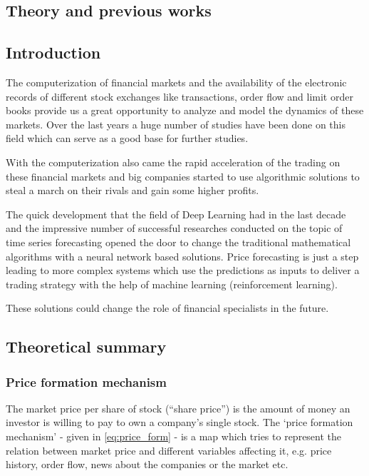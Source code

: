 \documentclass[11pt,a4paper,oneside]{article}
\begin{document}
\begin{center}
  \section{Theory and previous works}
  \label{sec:theory_prev}
\end{center}

\subsection{Introduction}
\label{sec:introduction}

The computerization of financial markets and the availability of the electronic records of different stock exchanges 
like transactions, order flow and limit order books provide us a great opportunity to analyze and model the dynamics of 
these markets. Over the last years a huge number of studies have been done on this field which can serve as a good base 
for further studies.

With the computerization also came the rapid acceleration of the trading on these financial markets and big companies 
started to use algorithmic solutions to steal a march on their rivals and gain some higher profits.

The quick development that the field of Deep Learning had in the last decade and the impressive number of successful 
researches conducted on the topic of time series forecasting opened the door to change the traditional mathematical 
algorithms with a neural network based solutions. Price forecasting is just a step leading to more complex systems 
which use the predictions as inputs to deliver a trading strategy with the help of machine learning 
(reinforcement learning).

These solutions could change the role of financial specialists in the future.

\subsection{Theoretical summary}
\label{sec:theoretical_summary}

  \subsubsection{Price formation mechanism}
  \label{sec:price_formation_mechanism}
  
  The market price per share of stock (“share price”) is the amount of money an investor is willing to pay to own 
  a company's single stock. The ‘price formation mechanism’ - given in \autoref{eq:price_form} - is a map which tries to 
  represent the relation between market price and different variables affecting it, e.g. price history, order flow, 
  news about the companies or the market etc.
\end{document}
